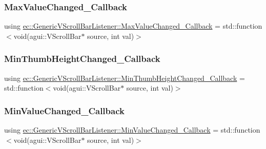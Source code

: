 \subsubsection{\texorpdfstring{Max\+Value\+Changed\+\_\+\+Callback}{MaxValueChanged\_Callback}}
{\footnotesize\ttfamily using \mbox{\hyperlink{classec_1_1_generic_v_scroll_bar_listener_a21e91025da3eebfc5da4b7489869183a}{ec\+::\+Generic\+V\+Scroll\+Bar\+Listener\+::\+Max\+Value\+Changed\+\_\+\+Callback}} =  std\+::function$<$void(agui\+::\+V\+Scroll\+Bar$\ast$ source, int val)$>$}

\mbox{\label{classec_1_1_generic_v_scroll_bar_listener_a64ef9708903097baf5cc98348f8a02fa}} 
\subsubsection{\texorpdfstring{Min\+Thumb\+Height\+Changed\+\_\+\+Callback}{MinThumbHeightChanged\_Callback}}
{\footnotesize\ttfamily using \mbox{\hyperlink{classec_1_1_generic_v_scroll_bar_listener_a64ef9708903097baf5cc98348f8a02fa}{ec\+::\+Generic\+V\+Scroll\+Bar\+Listener\+::\+Min\+Thumb\+Height\+Changed\+\_\+\+Callback}} =  std\+::function$<$void(agui\+::\+V\+Scroll\+Bar$\ast$ source, int val)$>$}

\mbox{\label{classec_1_1_generic_v_scroll_bar_listener_ad88274a7e9cf15ea8ff56b5cffed71b2}} 
\subsubsection{\texorpdfstring{Min\+Value\+Changed\+\_\+\+Callback}{MinValueChanged\_Callback}}
{\footnotesize\ttfamily using \mbox{\hyperlink{classec_1_1_generic_v_scroll_bar_listener_ad88274a7e9cf15ea8ff56b5cffed71b2}{ec\+::\+Generic\+V\+Scroll\+Bar\+Listener\+::\+Min\+Value\+Changed\+\_\+\+Callback}} =  std\+::function$<$void(agui\+::\+V\+Scroll\+Bar$\ast$ source, int val)$>$}

